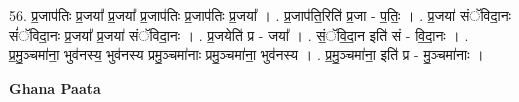 \documentclass[17pt]{extarticle}
\begin{document}
56. प्र॒जाप॑तिः प्र॒जया᳚ प्र॒जया᳚ प्र॒जाप॑तिः प्र॒जाप॑तिः प्र॒जया᳚ । . प्र॒जाप॑ति॒रिति॑ प्र॒जा - प॒तिः॒ । . प्र॒जया॑ संॅविदा॒नः सं॑ॅविदा॒नः प्र॒जया᳚ प्र॒जया॑ संॅविदा॒नः । . प्र॒जयेति॑ प्र - जया᳚ । . सं॒ॅवि॒दा॒न इति॑ सं - वि॒दा॒नः । . प्र॒मु॒ञ्चमा॑ना॒ भुव॑नस्य॒ भुव॑नस्य प्रमु॒ञ्चमा॑नाः प्रमु॒ञ्चमा॑ना॒ भुव॑नस्य । . प्र॒मु॒ञ्चमा॑ना॒ इति॑ प्र - मु॒ञ्चमा॑नाः । \newline

\textbf{Ghana Paata } \newline
\end{document}
